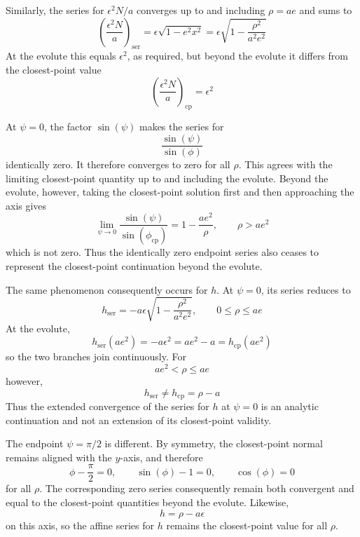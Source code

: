\documentclass[a4paper]{amsart}
\begin{document}
Similarly, the series for $\epsilon^2N/a$ converges up to and including $\rho=ae$ and sums to
\begin{equation*}
\left(\frac{\epsilon^2N}{a}\right)_{\mathrm{ser}}
=\epsilon\sqrt{1-e^2x^2}
=\epsilon\sqrt{1-\frac{\rho^2}{a^2e^2}}
\end{equation*}
At the evolute this equals $\epsilon^2$, as required, but beyond the evolute it differs from the closest-point value
\begin{equation*}
\left(\frac{\epsilon^2N}{a}\right)_{\mathrm{cp}}
=
\epsilon^2
\end{equation*}

At $\psi=0$, the factor $\sin(\psi)$ makes the series for
\begin{equation*}
\frac{\sin(\psi)}{\sin(\phi)}
\end{equation*}
identically zero. It therefore converges to zero for all $\rho$. This agrees with the limiting closest-point quantity up to and including the evolute. Beyond the evolute, however, taking the closest-point solution first and then approaching the axis gives
\begin{equation*}
\lim_{\psi\to0}\frac{\sin(\psi)}{\sin(\phi_{\mathrm{cp}})}
=
1-\frac{ae^2}{\rho},\qquad\rho>ae^2
\end{equation*}
which is not zero. Thus the identically zero endpoint series also ceases to represent the closest-point continuation beyond the evolute.

The same phenomenon consequently occurs for $h$. At $\psi=0$, its series reduces to
\begin{equation*}
h_{\mathrm{ser}}
=
-a\epsilon\sqrt{1-\frac{\rho^2}{a^2e^2}},\qquad 0\leq\rho\leq ae
\end{equation*}
At the evolute,
\begin{equation*}
h_{\mathrm{ser}}(ae^2)
= -a\epsilon^2
= ae^2-a
= h_{\mathrm{cp}}(ae^2)
\end{equation*}
so the two branches join continuously. For
\begin{equation*}
ae^2<\rho\leq ae
\end{equation*}
however,
\begin{equation*}
h_{\mathrm{ser}}\neq h_{\mathrm{cp}}=\rho-a
\end{equation*}
Thus the extended convergence of the series for $h$ at $\psi=0$ is an analytic continuation and not an extension of its closest-point validity.

The endpoint $\psi=\pi/2$ is different. By symmetry, the closest-point normal remains aligned with the $y$-axis, and therefore
\begin{equation*}
\phi-\frac{\pi}{2}=0,
\qquad
\sin(\phi)-1=0,
\qquad
\cos(\phi)=0
\end{equation*}
for all $\rho$. The corresponding zero series consequently remain both convergent and equal to the closest-point quantities beyond the evolute. Likewise,
\begin{equation*}
h=\rho-a\epsilon
\end{equation*}
on this axis, so the affine series for $h$ remains the closest-point value for all $\rho$.
\end{document}
